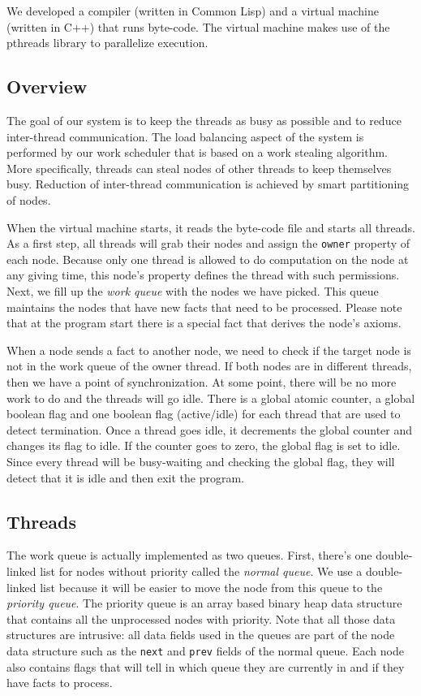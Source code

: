 
We developed a compiler (written in Common Lisp) and a virtual machine (written in C++) that runs
byte-code. The virtual machine makes use of the pthreads library to parallelize execution.

\subsection{Overview}

The goal of our system is to keep the threads as busy as possible and to reduce inter-thread communication.
The load balancing aspect of the system is performed by our work scheduler that is based on a work
stealing algorithm. More specifically, threads can steal nodes of other threads to keep themselves busy.
Reduction of inter-thread communication is achieved by smart partitioning of nodes.

When the virtual machine starts, it reads the byte-code file and starts all threads.
As a first step, all threads will grab their nodes and assign the \texttt{owner} property of each node.
Because only one thread is allowed to do computation on the node at any giving time, this node's property
defines the thread with such permissions.
Next, we fill up the \emph{work queue} with the nodes we have picked. This queue
maintains the nodes that have new facts that need to be processed. Please note that at the program start
there is a special fact that derives the node's axioms.

When a node sends a fact to another node, we need to check if the target node is not in the work queue of the owner thread.
If both nodes are in different threads, then we have a point of synchronization. At some point,
there will be no more work to do and the threads will go idle. There is a global atomic counter, a global
boolean flag and one boolean flag (active/idle) for each thread that are used to detect termination.
Once a thread goes idle, it decrements the global counter and changes its flag to idle. If the counter
goes to zero, the global flag is set to idle. Since every thread will be busy-waiting and checking
the global flag, they will detect that it is idle and then exit the program.

\subsection{Threads}

The work queue is actually implemented as two queues. First, there's one double-linked list for nodes
without priority called the \emph{normal queue}.
We use a double-linked list because it will be easier to move the node from this queue to the
\emph{priority queue}. The priority queue is an array based binary heap data structure that contains
all the unprocessed nodes with priority. Note that all those data structures are intrusive: all data
fields used in the queues are part of the node data structure such as the \texttt{next} and \texttt{prev}
fields of the normal queue. Each node also contains flags that will tell in which queue they are currently
in and if they have facts to process.

